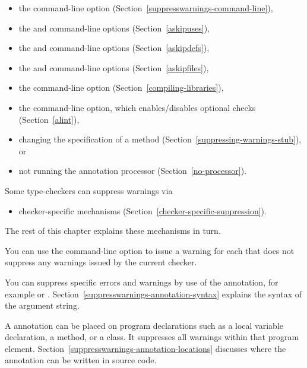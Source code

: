 \begin{itemize}
\item
  the  command-line option (Section~\ref{suppresswarnings-command-line}),
\item
  the  and  command-line options (Section~\ref{askipuses}),
\item
  the  and  command-line options (Section~\ref{askipdefs}),
\item
  the  and  command-line options (Section~\ref{askipfiles}),
\item
  the  command-line
  option (Section~\ref{compiling-libraries}),
\item
  the  command-line option, which enables/disables optional checks (Section~\ref{alint}),
\item
  changing the specification of a method (Section~\ref{suppressing-warnings-stub}), or
\item
  not running the annotation processor
  (Section~\ref{no-processor}).
\end{itemize}

Some type-checkers can suppress warnings via
\begin{itemize}
\item
  checker-specific mechanisms (Section~\ref{checker-specific-suppression}).
\end{itemize}

\noindent
The rest of this chapter explains these mechanisms in turn.

You can use the  command-line option to
issue a warning for each  that does not suppress
any warnings issued by the current checker.



\begin{sloppypar}
You can suppress specific errors and warnings by use of the
 annotation, for example
 or .
Section~\ref{suppresswarnings-annotation-syntax} explains the syntax of the
argument string.
\end{sloppypar}

A 
annotation can be placed on program declarations such as a local
variable declaration, a method, or a class.  It suppresses all warnings
within that program element.
Section~\ref{suppresswarnings-annotation-locations} discusses where the
annotation can be written in source code.

